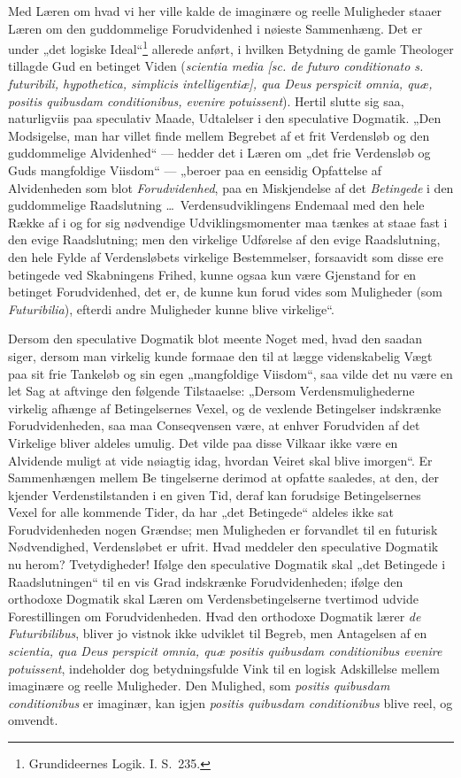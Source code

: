 \documentclass[12pt]{book}
\newcommand{\opage}[1]{\marginnote{\footnotesize\textit{[#1]}}}
\begin{document}
Med Læren om hvad vi her ville kalde de imaginære og
reelle Muligheder staaer Læren om den guddommelige Forudvidenhed
i nøieste Sammenhæng. Det er under „det logiske
\opage{244}Ideal“\footnote{Grundideernes Logik. I. S.~235.}%
{} allerede anført, i hvilken Betydning de gamle
Theologer tillagde Gud en betinget Viden (\textit{scientia media
[sc. de futuro conditionato s. futuribili, hypothetica,
simplicis intelligentiæ], qua Deus perspicit omnia, quæ,
positis quibusdam conditionibus, evenire potuissent}).
Hertil slutte sig saa, naturligviis paa speculativ Maade, Udtalelser
i den speculative Dogmatik. „Den Modsigelse, man
har villet finde mellem Begrebet af et frit Verdensløb og den
guddommelige Alvidenhed“ --- hedder det i Læren om „det frie
Verdensløb og Guds mangfoldige Viisdom“ --- „beroer paa en
eensidig Opfattelse af Alvidenheden som blot \emph{Forudvidenhed},
paa en Miskjendelse af det \emph{Betingede} i den guddommelige
Raadslutning \dots\ Verdensudviklingens Endemaal med
den hele Række af i og for sig nødvendige Udviklingsmomenter
maa tænkes at staae fast i den evige Raadslutning; men den
virkelige Udførelse af den evige Raadslutning, den hele Fylde
af Verdensløbets virkelige Bestemmelser, forsaavidt som disse
ere betingede ved Skabningens Frihed, kunne ogsaa kun være
Gjenstand for en betinget Forudvidenhed, det er, de kunne
kun forud vides som Muligheder (som \textit{Futuribilia}), efterdi
andre Muligheder kunne blive virkelige“.

Dersom den speculative Dogmatik blot meente Noget med,
hvad den saadan siger, dersom man virkelig kunde formaae
den til at lægge videnskabelig Vægt paa sit frie Tankeløb og
sin egen „mangfoldige Viisdom“, saa vilde det nu være
en let Sag at aftvinge den følgende Tilstaaelse: „Dersom
Verdensmulighederne virkelig afhænge af Betingelsernes Vexel,
og de vexlende Betingelser indskrænke Forudvidenheden, saa
maa Conseqvensen være, at enhver Forudviden af det Virkelige
bliver aldeles umulig. Det vilde paa disse Vilkaar ikke
være en Alvidende muligt at vide nøiagtig idag, hvordan
Veiret skal blive imorgen“. Er Sammenhængen mellem Be%
\opage{245}tingelserne derimod at opfatte saaledes, at den, der kjender
Verdenstilstanden i en given Tid, deraf kan forudsige Betingelsernes
Vexel for alle kommende Tider, da har „det Betingede“
aldeles ikke sat Forudvidenheden nogen Grændse;
men Muligheden er forvandlet til en futurisk Nødvendighed,
Verdensløbet er ufrit. Hvad meddeler den speculative Dogmatik
nu herom? Tvetydigheder! Ifølge den speculative Dogmatik
skal „det Betingede i Raadslutningen“ til en vis Grad indskrænke
Forudvidenheden; ifølge den orthodoxe Dogmatik skal
Læren om Verdensbetingelserne tvertimod udvide Forestillingen
om Forudvidenheden. Hvad den orthodoxe Dogmatik lærer
\textit{de Futuribilibus}, bliver jo vistnok ikke udviklet til Begreb,
men Antagelsen af en \textit{scientia, qua Deus perspicit omnia,
quæ positis quibusdam conditionibus evenire potuissent},
indeholder dog betydningsfulde Vink til en logisk Adskillelse
mellem imaginære og reelle Muligheder. Den Mulighed,
som \textit{positis quibusdam conditionibus} er imaginær, kan
igjen \textit{positis quibusdam conditionibus} blive reel, og omvendt.
\end{document}
